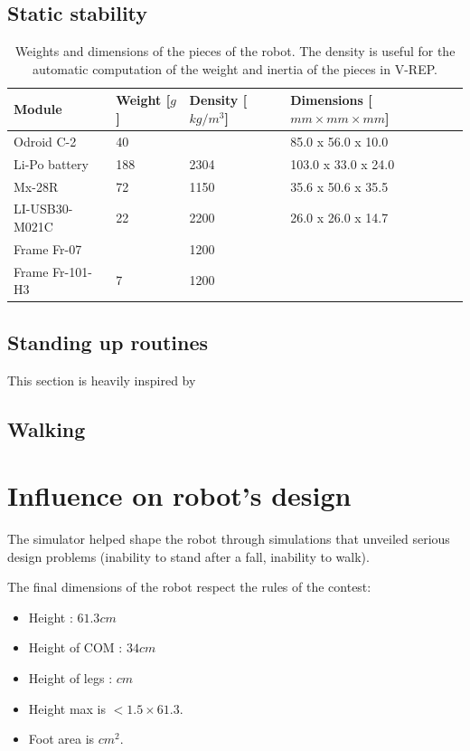 \subsection{Static stability}
\begin{table}[htp]
\center
\begin{tabularx}{\textwidth}{@{} X X X l @{}}
\toprule
\textbf{Module} & \textbf{Weight [$g$]} &  \textbf{Density [$kg/m^3$]}& \textbf{Dimensions [$mm \times mm \times mm$]}\\ 
\midrule
Odroid C-2 & 40 &  & 85.0 x 56.0 x 10.0\\
Li-Po battery & 188 & 2304 & 103.0 x 33.0 x 24.0\\
Mx-28R & 72 & 1150 & 35.6 x 50.6 x 35.5\\
LI-USB30-M021C & 22 & 2200 & 26.0 x 26.0 x 14.7\\
Frame Fr-07 & & 1200 & \\
Frame Fr-101-H3 & 7 & 1200 & \\
\bottomrule
\end{tabularx}
\caption[Weights and dimensions of the pieces of the robot]{Weights and dimensions of the pieces of the robot. The density is useful for the automatic computation of the weight and inertia of the pieces in V-REP.}
\label{table:weights}
\end{table}
\subsection{Standing up routines}
This section is heavily inspired by \cite{Stuckler06}

\subsection{Walking}

\section{Influence on robot's design}
The simulator helped shape the robot through simulations that unveiled serious design problems (inability to stand after a fall, inability to walk).

The final dimensions of the robot respect the rules of the contest:
\begin{itemize}
\item Height : $61.3cm$
\item Height of COM : $34cm$
\item Height of legs : $cm$
\item Height max is $< 1.5 \times 61.3$.
\item Foot area is $ cm^2$.
\end{itemize}